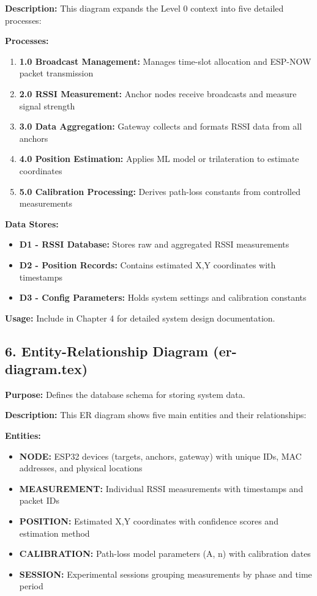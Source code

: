 \textbf{Description:}
This diagram expands the Level 0 context into five detailed processes:

\textbf{Processes:}
\begin{enumerate}
    \item \textbf{1.0 Broadcast Management:} Manages time-slot allocation and ESP-NOW packet transmission
    \item \textbf{2.0 RSSI Measurement:} Anchor nodes receive broadcasts and measure signal strength
    \item \textbf{3.0 Data Aggregation:} Gateway collects and formats RSSI data from all anchors
    \item \textbf{4.0 Position Estimation:} Applies ML model or trilateration to estimate coordinates
    \item \textbf{5.0 Calibration Processing:} Derives path-loss constants from controlled measurements
\end{enumerate}

\textbf{Data Stores:}
\begin{itemize}
    \item \textbf{D1 - RSSI Database:} Stores raw and aggregated RSSI measurements
    \item \textbf{D2 - Position Records:} Contains estimated X,Y coordinates with timestamps
    \item \textbf{D3 - Config Parameters:} Holds system settings and calibration constants
\end{itemize}

\textbf{Usage:} Include in Chapter 4 for detailed system design documentation.

\subsection*{6. Entity-Relationship Diagram (er-diagram.tex)}
\textbf{Purpose:} Defines the database schema for storing system data.

\textbf{Description:}
This ER diagram shows five main entities and their relationships:

\textbf{Entities:}
\begin{itemize}
    \item \textbf{NODE:} ESP32 devices (targets, anchors, gateway) with unique IDs, MAC addresses, and physical locations
    \item \textbf{MEASUREMENT:} Individual RSSI measurements with timestamps and packet IDs
    \item \textbf{POSITION:} Estimated X,Y coordinates with confidence scores and estimation method
    \item \textbf{CALIBRATION:} Path-loss model parameters (A, n) with calibration dates
    \item \textbf{SESSION:} Experimental sessions grouping measurements by phase and time period
\end{itemize}

